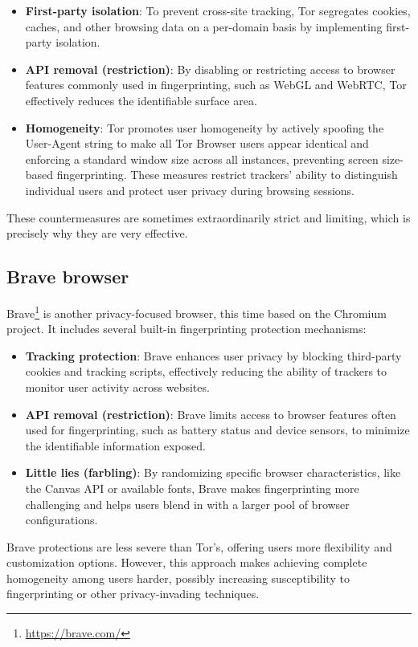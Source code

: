 \begin{itemize}
	\item \textbf{First-party isolation}: To prevent cross-site tracking, Tor segregates cookies, caches, and other browsing data on a per-domain basis by implementing first-party isolation.
	\item \textbf{API removal (restriction)}: By disabling or restricting access to browser features commonly used in fingerprinting, such as WebGL and WebRTC, Tor effectively reduces the identifiable surface area.
	\item \textbf{Homogeneity}: Tor promotes user homogeneity by actively spoofing the User-Agent string to make all Tor Browser users appear identical and enforcing a standard window size across all instances, preventing screen size-based fingerprinting. These measures restrict trackers' ability to distinguish individual users and protect user privacy during browsing sessions.
\end{itemize}

These countermeasures are sometimes extraordinarily strict and limiting, which is precisely why they are very effective.

\subsection{Brave browser}

Brave\footnote{\url{https://brave.com/}} is another privacy-focused browser, this time based on the Chromium project. It includes several built-in fingerprinting protection mechanisms:

\begin{itemize}
	\item \textbf{Tracking protection}: Brave enhances user privacy by blocking third-party cookies and tracking scripts, effectively reducing the ability of trackers to monitor user activity across websites.
	\item \textbf{API removal (restriction)}: Brave limits access to browser features often used for fingerprinting, such as battery status and device sensors, to minimize the identifiable information exposed.
	\item \textbf{Little lies (farbling)}: By randomizing specific browser characteristics, like the Canvas API or available fonts, Brave makes fingerprinting more challenging and helps users blend in with a larger pool of browser configurations.
\end{itemize}

Brave protections are less severe than Tor's, offering users more flexibility and customization options. However, this approach makes achieving complete homogeneity among users harder, possibly increasing susceptibility to fingerprinting or other privacy-invading techniques.

